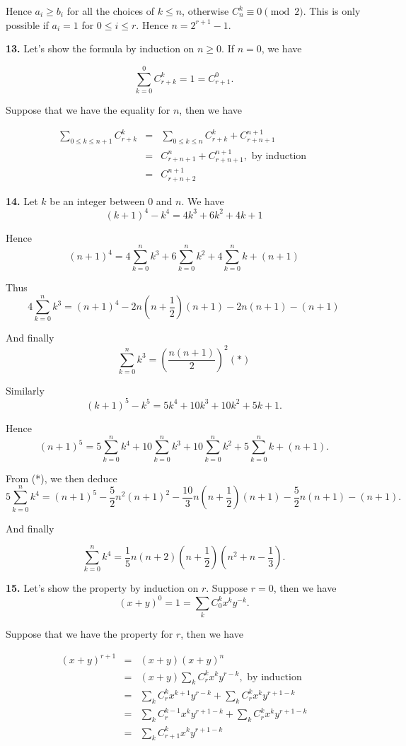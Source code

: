 \documentclass[a4paper,12pt]{article}
\newcommand{\newpar}[1]{\bigskip \noindent \textbf{#1.}}
\begin{document}
Hence $a_i \ge b_i$ for all the choices of $k \le n$, otherwise $C_n^k
\equiv 0 \pmod 2$. This is only possible if $a_i = 1$ for $0 \le i \le
r$.  Hence $n = 2^{r+1}-1$.

\newpar{13} Let's show the formula by induction on $n \ge 0$.  If
$n=0$, we have

\[ \sum_{k=0}^0 C_{r+k}^k = 1 = C_{r+1}^0.\]

Suppose that we have the equality for $n$, then we have

\begin{eqnarray*}
  \sum_{0\le k\le n+1}C_{r+k}^k &=& \sum_{0\le k \le n}C_{r+k}^k +
  C_{r+n+1}^{n+1} \\
  &=& C_{r+n+1}^n + C_{r+n+1}^{n+1}, \mbox{ by induction } \\
  &=& C_{r+n+2}^{n+1}
\end{eqnarray*}

\newpar{14} Let $k$ be an integer between $0$ and $n$.  We have
\[ (k+1)^4 - k^4 = 4 k^3 + 6 k^2 + 4 k + 1\]

Hence
\[ (n+1)^4 = 4 \sum_{k=0}^n k^3 + 6 \sum_{k=0}^n k^2 + 4 \sum_{k=0}^n k
+ (n+1)\]

Thus
\[ 4 \sum_{k=0}^n k^3 = (n+1)^4 - 2 n\left(n +
\frac{1}{2}\right)(n+1) - 2 n(n+1) - (n+1)\]

And finally
\[ \sum_{k=0}^n k^3 = \left( \frac{n(n+1)}{2} \right)^2 (*)\]

Similarly
\[ (k+1)^5 - k^5 = 5 k^4 + 10 k^3 + 10 k^2 + 5 k + 1.\]

Hence
\[ (n+1)^5 = 5 \sum_{k=0}^n k^4 + 10 \sum_{k=0}^n k^3 + 10
\sum_{k=0}^n k^2 + 5 \sum_{k=0}^n k + (n+1).\]

From (*), we then deduce
\[ 5 \sum_{k=0}^n k^4 = (n+1)^5 - \frac{5}{2} n^2(n+1)^2 -
\frac{10}{3}n\left(n+\frac{1}{2}\right) (n+1) -
\frac{5}{2}n(n+1)-(n+1).\]

And finally

\[ \sum_{k=0}^n k^4 = \frac{1}{5}n(n+2)\left(n+\frac{1}{2}\right)
\left(n^2 + n - \frac{1}{3}\right).\]

\newpar{15} Let's show the property by induction on $r$.  Suppose
$r=0$, then we have
\[ (x+y)^0 = 1 = \sum_k C_0^k x^k y^{-k}.\]

Suppose that we have the property for $r$, then we have

\begin{eqnarray*}
  (x+y)^{r+1} &=& (x + y) (x+y)^n \\
  &=& (x+y) \sum_k C_r^k x^k y^{r-k}, \mbox{ by induction} \\
  &=& \sum_k C_r^k x^{k+1} y^{r-k} + \sum_k C_r^k x^k y^{r+1-k} \\
  &=& \sum_k C_r^{k-1} x^k y^{r+1-k} + \sum_k C_r^k x^k y^{r+1-k} \\
  &=& \sum_k C_{r+1}^k x^k y^{r+1-k}
\end{eqnarray*}
\end{document}
